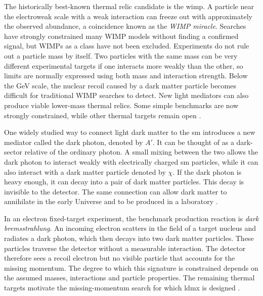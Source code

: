 The historically best-known thermal relic candidate is the \gls{wimp}. A
particle near the electroweak scale with a weak interaction can freeze out with
approximately the observed abundance, a coincidence known as the \emph{WIMP
miracle}. Searches have strongly constrained many WIMP models without finding a
confirmed signal, but WIMPs as a class have not been excluded. Experiments do
not rule out a particle mass by itself. Two particles with the same mass can be
very different experimental targets if one interacts more weakly than the
other, so limits are normally expressed using both mass and interaction
strength. Below the GeV scale, the nuclear recoil caused by a dark matter
particle becomes difficult for traditional WIMP searches to detect. New light
mediators can also produce viable lower-mass thermal relics. Some simple
benchmarks are now strongly constrained, while other thermal targets remain
open \cite{cirelli2026-darkmatter,krnjaic2026-thermal-dark-photon,
ldmx2025-overview}.

One widely studied way to connect light dark matter to the \gls{sm} introduces
a new mediator called the \gls{dark photon}, denoted by \(A'\). It can be
thought of as a dark-sector relative of the ordinary photon. A small mixing
between the two allows the dark photon to interact weakly with electrically
charged \gls{sm} particles, while it can also interact with a dark matter
particle denoted by \(\chi\). If the dark photon is heavy enough, it can decay
into a pair of dark matter particles. This decay is invisible to the detector.
The same connection can allow dark matter to annihilate in the early Universe
and to be produced in a laboratory
\cite{cirelli2026-darkmatter,ldmx2025-overview}.

In an electron fixed-target experiment, the benchmark production reaction is
\emph{dark bremsstrahlung}. An incoming electron scatters in the field of a
target nucleus and radiates a dark photon, which then decays into two dark
matter particles. These particles traverse the detector without a measurable
interaction. The detector therefore sees a recoil electron but no visible
particle that accounts for the missing momentum. The degree to which this
signature is constrained depends on the assumed masses, interactions and
particle properties. The remaining thermal targets motivate the
missing-momentum search for which \gls{ldmx} is designed
\cite{akesson2018-ldmx,ldmx2025-overview}.


